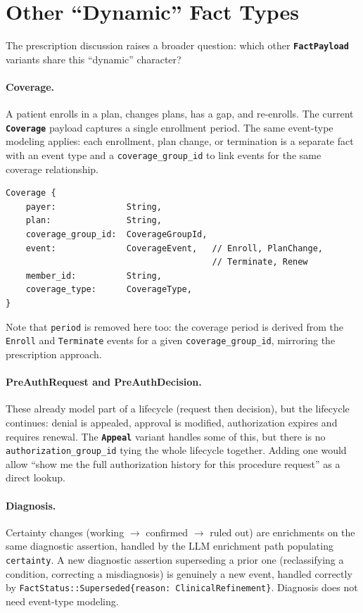 \documentclass[11pt]{article}
\newcommand{\entity}[1]{\texttt{\textbf{#1}}}
\newcommand{\field}[1]{\texttt{#1}}
\begin{document}
\section{Other ``Dynamic'' Fact Types}
\label{sec:dynamic}

The prescription discussion raises a broader question: which other
\entity{FactPayload} variants share this ``dynamic'' character?

\paragraph{Coverage.}
A patient enrolls in a plan, changes plans, has a gap, and re-enrolls.
The current \entity{Coverage} payload captures a single enrollment
period. The same event-type modeling applies: each enrollment, plan
change, or termination is a separate fact with an event type and a
\field{coverage\_group\_id} to link events for the same coverage
relationship.

\begin{lstlisting}
Coverage {
    payer:              String,
    plan:               String,
    coverage_group_id:  CoverageGroupId,
    event:              CoverageEvent,   // Enroll, PlanChange,
                                         // Terminate, Renew
    member_id:          String,
    coverage_type:      CoverageType,
}
\end{lstlisting}

Note that \field{period} is removed here too: the coverage period
is derived from the \field{Enroll} and \field{Terminate} events
for a given \field{coverage\_group\_id}, mirroring the prescription
approach.

\paragraph{PreAuthRequest and PreAuthDecision.}
These already model part of a lifecycle (request then decision), but
the lifecycle continues: denial is appealed, approval is modified,
authorization expires and requires renewal. The \entity{Appeal} variant
handles some of this, but there is no \field{authorization\_group\_id}
tying the whole lifecycle together. Adding one would allow ``show me
the full authorization history for this procedure request'' as a direct
lookup.

\paragraph{Diagnosis.}
Certainty changes (working $\to$ confirmed $\to$ ruled out) are
enrichments on the same diagnostic assertion, handled by the LLM
enrichment path populating \field{certainty}. A new diagnostic
assertion superseding a prior one (reclassifying a condition,
correcting a misdiagnosis) is genuinely a new event, handled correctly
by \field{FactStatus::Superseded\{reason: ClinicalRefinement\}}.
Diagnosis does not need event-type modeling.
\end{document}
